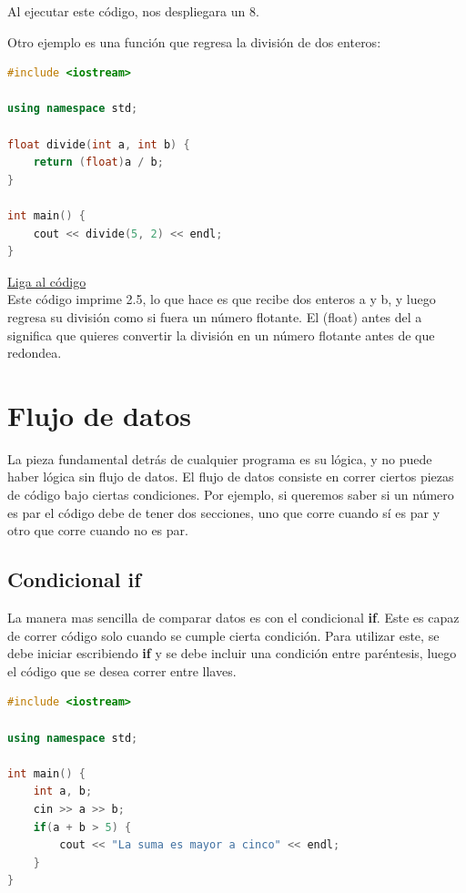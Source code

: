 \documentclass{article}
\begin{document}
Al ejecutar este código, nos despliegara un 8.

Otro ejemplo es una función que regresa la división de dos enteros:

\begin{lstlisting}[language=C++, title=Función de división]
#include <iostream>

using namespace std;

float divide(int a, int b) {
	return (float)a / b;
}

int main() {
	cout << divide(5, 2) << endl;
}
\end{lstlisting}
\href{https://repl.it/@Jamesscn/Funciones}{Liga al código}\\

Este código imprime 2.5, lo que hace es que recibe dos enteros a y b, y luego regresa su división como si fuera un número flotante. El (float) antes del a significa que quieres convertir la división en un número flotante antes de que redondea.

\section{Flujo de datos}

La pieza fundamental detrás de cualquier programa es su lógica, y no puede haber lógica sin flujo de datos. El flujo de datos consiste en correr ciertos piezas de código bajo ciertas condiciones. Por ejemplo, si queremos saber si un número es par el código debe de tener dos secciones, uno que corre cuando sí es par y otro que corre cuando no es par.

\subsection{Condicional if}

La manera mas sencilla de comparar datos es con el condicional \textbf{if}. Este es capaz de correr código solo cuando se cumple cierta condición. Para utilizar este, se debe iniciar escribiendo \textbf{if} y se debe incluir una condición entre paréntesis, luego el código que se desea correr entre llaves.

\begin{lstlisting}[language=C++, title=Condiciones]
#include <iostream>

using namespace std;

int main() {
	int a, b;
	cin >> a >> b;
	if(a + b > 5) {
		cout << "La suma es mayor a cinco" << endl;
	}
}
\end{lstlisting}
\end{document}
